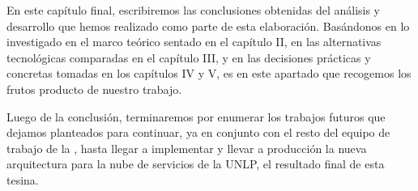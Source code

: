 En este capítulo final, escribiremos las conclusiones obtenidas del análisis y desarrollo que hemos realizado como parte de esta elaboración. Basándonos en lo investigado en el marco teórico sentado en el capítulo II, en las alternativas tecnológicas comparadas en el capítulo III, y en las decisiones prácticas y concretas tomadas en los capítulos IV y V, es en este apartado que recogemos los frutos producto de nuestro trabajo.

Luego de la conclusión, terminaremos por enumerar los trabajos futuros que dejamos planteados para continuar, ya en conjunto con el resto del equipo de trabajo de la {\direccionDesarrollo}, hasta llegar a implementar y llevar a producción la nueva arquitectura para la nube de servicios de la UNLP, el resultado final de esta tesina.
